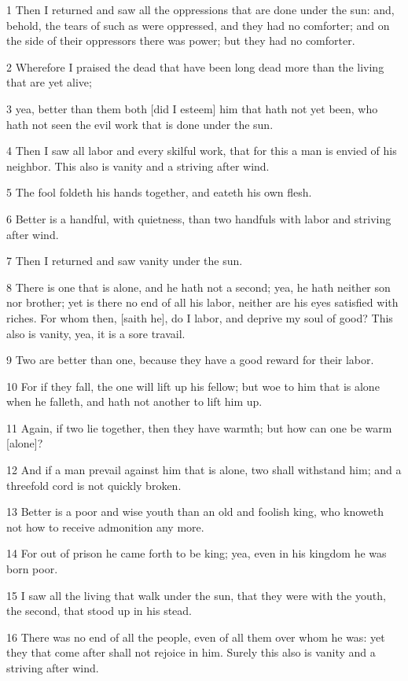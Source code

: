 \par 1 Then I returned and saw all the oppressions that are done under the sun: and, behold, the tears of such as were oppressed, and they had no comforter; and on the side of their oppressors there was power; but they had no comforter.
\par 2 Wherefore I praised the dead that have been long dead more than the living that are yet alive;
\par 3 yea, better than them both [did I esteem] him that hath not yet been, who hath not seen the evil work that is done under the sun.
\par 4 Then I saw all labor and every skilful work, that for this a man is envied of his neighbor. This also is vanity and a striving after wind.
\par 5 The fool foldeth his hands together, and eateth his own flesh.
\par 6 Better is a handful, with quietness, than two handfuls with labor and striving after wind.
\par 7 Then I returned and saw vanity under the sun.
\par 8 There is one that is alone, and he hath not a second; yea, he hath neither son nor brother; yet is there no end of all his labor, neither are his eyes satisfied with riches. For whom then, [saith he], do I labor, and deprive my soul of good? This also is vanity, yea, it is a sore travail.
\par 9 Two are better than one, because they have a good reward for their labor.
\par 10 For if they fall, the one will lift up his fellow; but woe to him that is alone when he falleth, and hath not another to lift him up.
\par 11 Again, if two lie together, then they have warmth; but how can one be warm [alone]?
\par 12 And if a man prevail against him that is alone, two shall withstand him; and a threefold cord is not quickly broken.
\par 13 Better is a poor and wise youth than an old and foolish king, who knoweth not how to receive admonition any more.
\par 14 For out of prison he came forth to be king; yea, even in his kingdom he was born poor.
\par 15 I saw all the living that walk under the sun, that they were with the youth, the second, that stood up in his stead.
\par 16 There was no end of all the people, even of all them over whom he was: yet they that come after shall not rejoice in him. Surely this also is vanity and a striving after wind.

